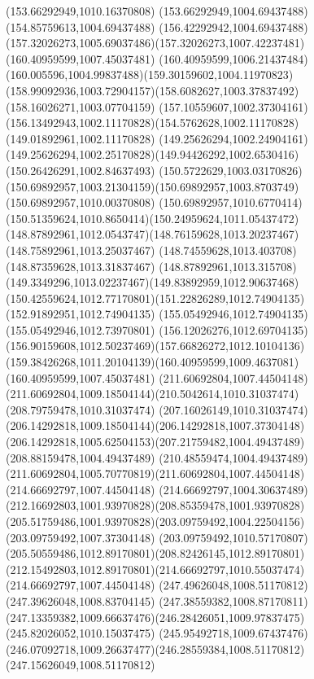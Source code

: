 {{\lineto(153.66292949,1010.16370808)
\lineto(153.66292949,1004.69437488)
\lineto(154.85759613,1004.69437488)
\curveto(156.42292942,1004.69437488)(157.32026273,1005.69037486)(157.32026273,1007.42237481)
\moveto(160.40959599,1007.45037481)
\curveto(160.40959599,1006.21437484)(160.005596,1004.99837488)(159.30159602,1004.11970823)
\curveto(158.99092936,1003.72904157)(158.6082627,1003.37837492)(158.16026271,1003.07704159)
\curveto(157.10559607,1002.37304161)(156.13492943,1002.11170828)(154.5762628,1002.11170828)
\lineto(149.01892961,1002.11170828)
\lineto(149.25626294,1002.24904161)
\curveto(149.25626294,1002.25170828)(149.94426292,1002.6530416)(150.26426291,1002.84637493)
\curveto(150.5722629,1003.03170826)(150.69892957,1003.21304159)(150.69892957,1003.8703749)
\lineto(150.69892957,1010.00370808)
\curveto(150.69892957,1010.6770414)(150.51359624,1010.8650414)(150.24959624,1011.05437472)
\curveto(148.87892961,1012.0543747)(148.76159628,1013.20237467)(148.75892961,1013.25037467)
\lineto(148.74559628,1013.403708)
\lineto(148.87359628,1013.31837467)
\curveto(148.87892961,1013.315708)(149.3349296,1013.02237467)(149.83892959,1012.90637468)
\curveto(150.42559624,1012.77170801)(151.22826289,1012.74904135)(152.91892951,1012.74904135)
\lineto(155.05492946,1012.74904135)
\lineto(155.05492946,1012.73970801)
\curveto(156.12026276,1012.69704135)(156.90159608,1012.50237469)(157.66826272,1012.10104136)
\curveto(159.38426268,1011.20104139)(160.40959599,1009.4637081)(160.40959599,1007.45037481)
\moveto(211.60692804,1007.44504148)
\curveto(211.60692804,1009.18504144)(210.5042614,1010.31037474)(208.79759478,1010.31037474)
\curveto(207.16026149,1010.31037474)(206.14292818,1009.18504144)(206.14292818,1007.37304148)
\curveto(206.14292818,1005.62504153)(207.21759482,1004.49437489)(208.88159478,1004.49437489)
\curveto(210.48559474,1004.49437489)(211.60692804,1005.70770819)(211.60692804,1007.44504148)
\moveto(214.66692797,1007.44504148)
\curveto(214.66692797,1004.30637489)(212.16692803,1001.93970828)(208.85359478,1001.93970828)
\curveto(205.51759486,1001.93970828)(203.09759492,1004.22504156)(203.09759492,1007.37304148)
\curveto(203.09759492,1010.57170807)(205.50559486,1012.89170801)(208.82426145,1012.89170801)
\curveto(212.15492803,1012.89170801)(214.66692797,1010.55037474)(214.66692797,1007.44504148)
\moveto(247.49626048,1008.51170812)
\lineto(247.39626048,1008.83704145)
\curveto(247.38559382,1008.87170811)(247.13359382,1009.66637476)(246.28426051,1009.97837475)
\lineto(245.82026052,1010.15037475)
\lineto(245.95492718,1009.67437476)
\curveto(246.07092718,1009.26637477)(246.28559384,1008.51170812)(247.15626049,1008.51170812)
}}
